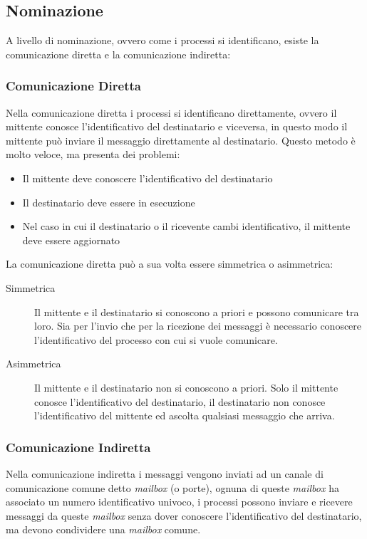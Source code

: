     \subsection{Nominazione}
        A livello di nominazione, ovvero come i processi si identificano, esiste la comunicazione diretta e la comunicazione indiretta:
        \subsubsection{Comunicazione Diretta}
            Nella comunicazione diretta i processi si identificano direttamente, ovvero il mittente conosce l'identificativo del destinatario e viceversa, in questo modo il mittente può inviare il messaggio direttamente al destinatario. Questo metodo è molto veloce, ma presenta dei problemi:
            \begin{itemize}
                \item Il mittente deve conoscere l'identificativo del destinatario
                \item Il destinatario deve essere in esecuzione
                \item Nel caso in cui il destinatario o il ricevente cambi identificativo, il mittente deve essere aggiornato
            \end{itemize}
            La comunicazione diretta può a sua volta essere simmetrica o asimmetrica:
            \begin{description}
                \item[Simmetrica] Il mittente e il destinatario si conoscono a priori e possono comunicare tra loro. Sia per l'invio che per la ricezione dei messaggi è necessario conoscere l'identificativo del processo con cui si vuole comunicare.
                \item[Asimmetrica] Il mittente e il destinatario non si conoscono a priori. Solo il mittente conosce l'identificativo del destinatario, il destinatario non conosce l'identificativo del mittente ed ascolta qualsiasi messaggio che arriva.
            \end{description}
        \subsubsection{Comunicazione Indiretta}
            Nella comunicazione indiretta i messaggi vengono inviati ad un canale di comunicazione comune detto \textit{mailbox} (o porte), ognuna di queste \textit{mailbox} ha associato un numero identificativo univoco, i processi possono inviare e ricevere messaggi da queste \textit{mailbox} senza dover conoscere l'identificativo del destinatario, ma devono condividere una \textit{mailbox} comune.
